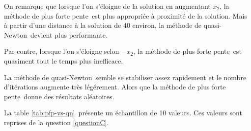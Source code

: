 \documentclass[11pt,a4paper,twoside,onecolumn,titlepage]{report}
\newcommand{\qn}{quasi-Newton}
\newcommand{\pfp}{plus forte pente}
\begin{document}
\begin{enumerate}[(a)]
On remarque que lorsque l'on s'éloigne de la solution en augmentant $x_2$, la méthode de \pfp\ est plus appropriée à proximité de la solution. Mais à partir d'une distance à la solution de 40 environ, la méthode de \qn\ devient plus performante.

Par contre, lorsque l'on s'éloigne selon $-x_2$, la méthode de \pfp\ est quasiment tout le temps plus inefficace.

La méthode de \qn\ semble se stabiliser assez rapidement et le nombre d'itérations augmente très légérement. Alors que la méthode de \pfp\ donne des résultats aléatoires.

La table \ref{tab:pfp-vs-qn}\ présente un échantillon de 10 valeurs. Ces valeurs sont reprises de la question \ref{questionC}.


\end{enumerate}
\end{document}
